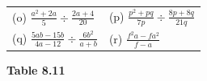 \begin{enumerate}[noitemsep, label=\textbf{\arabic*}. ]
{{\begin{center}
\begin{xtabular}[t]{|l|l|}
        (o) $\frac{{a}^{2}+2a}{5}÷\frac{2a+4}{20}$\hspace{1ex} &
        (p) $\frac{{p}^{2}+pq}{7p}÷\frac{8p+8q}{21q}$\hspace{1ex}%
     \tabularnewline{}
        (q) $\frac{5ab-15b}{4a-12}÷\frac{6{b}^{2}}{a+b}$\hspace{1ex} &
        (r) $\frac{{f}^{2}a-f{a}^{2}}{f-a}$%
     \tabularnewline{}
    \end{xtabular}
      \end{center}
    \begin{center}{\small\bfseries Table 8.11}\end{center}
          } %
        }{%
        }
\end{enumerate}
